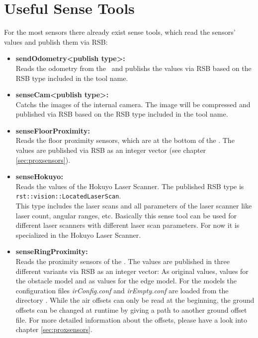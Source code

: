 \section{Useful Sense Tools}
\label{sec:sensetools}

For the most sensors there already exist sense tools, which read the sensors' values and publish them via RSB:
\begin{itemize}
\item {\bf sendOdometry<publish type>:} \\
Reads the odometry from the \diwheel\ and publishs the values via RSB based on the RSB type included in the tool name.

\item {\bf senseCam<publish type>:} \\
Catchs the images of the internal camera. The image will be compressed and published via RSB based on the RSB type included in the tool name.

\item {\bf senseFloorProximity:} \\
Reads the floor proximity sensors, which are at the bottom of the \amiro. The values are published via RSB as an integer vector (see chapter \ref{sec:proxsensors}).

\item {\bf senseHokuyo:} \\
Reads the values of the Hokuyo Laser Scanner. The published RSB type is\\
{\tt rst::vision::LocatedLaserScan}.\\
This type includes the laser scans and all parameters of the laser scanner like laser count, angular ranges, etc. Basically this sense tool can be used for different laser scanners with different laser scan parameters. For now it is specialized in the Hokuyo Laser Scanner.

\item {\bf senseRingProximity:} \\
Reads the proximity sensors of the \proxring. The values are published in three different variants via RSB as an integer vector: As original values, values for the obstacle model and as values for the edge model. For the models the configuration files {\it irConfig.conf} and {\it irEmpty.conf} are loaded from the directory \amirohomepathI\initialnameI. While the air offsets can only be read at the beginning, the ground offsets can be changed at runtime by giving a path to another ground offset file. For more detailed information about the offsets, please have a look into chapter \ref{sec:proxsensors}.
\end{itemize}

